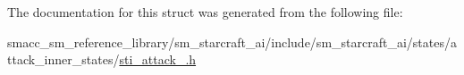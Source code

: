 The documentation for this struct was generated from the following file\+:\begin{DoxyCompactItemize}
\item 
smacc\+\_\+sm\+\_\+reference\+\_\+library/sm\+\_\+starcraft\+\_\+ai/include/sm\+\_\+starcraft\+\_\+ai/states/attack\+\_\+inner\+\_\+states/\hyperlink{sti__attack__2_8h}{sti\+\_\+attack\+\_.\+h}\end{DoxyCompactItemize}
